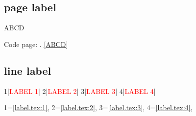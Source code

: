 \noindent
\subsection{page label}
\bgroup
\begin{CDRBlock}[reflabel=ABCD]
ABCD
\end{CDRBlock}
Code page: \pageref{ABCD}. \ref{ABCD}
\egroup
%
\subsection{line label}
\begin{CDRBlock}[pygments=true,escapeinside=||]
1|\label{label.tex:1}\textcolor{red}{LABEL 1}|
2|\label{label.tex:2}\textcolor{red}{LABEL 2}|
3|\label{label.tex:3}\textcolor{red}{LABEL 3}|
4|\label{label.tex:4}\textcolor{red}{LABEL 4}|
\end{CDRBlock}
1=\ref{label.tex:1},
2=\ref{label.tex:2},
3=\ref{label.tex:3},
4=\ref{label.tex:4},
